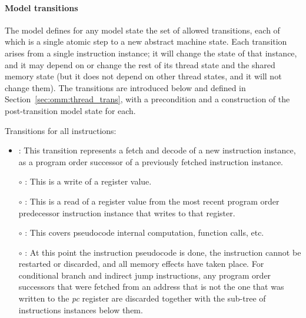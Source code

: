 \paragraph{Model transitions}
The model defines for any model state the set of allowed transitions, each of which is a single atomic step to a new abstract machine state.
Each transition arises from a single instruction instance; it will change the state of that instance, and it may depend on or change the rest of its thread state and the shared memory state (but it does not depend on other thread states, and it will not change them).
The transitions are introduced below and defined in Section~\ref{sec:omm:thread_trans}, with a precondition and a construction of the post-transition model state for each.

\noindent Transitions for all instructions:
\begin{itemize}
\item {}: This transition represents a fetch and decode of a new instruction instance, as a program order successor of a previously fetched instruction instance.
\item[$\circ$] : This is a write of a register value.
\item[$\circ$] : This is a read of a register value from the most recent program order predecessor instruction instance that writes to that register.
\item[$\circ$] : This covers pseudocode internal computation, function calls, etc.
\item[$\circ$] : At this point the instruction pseudocode is done, the instruction cannot be restarted or discarded, and all memory effects have taken place.
For conditional branch and indirect jump instructions, any program order successors that were fetched from an address that is not the one that was written to the {\em pc} register are discarded together with the sub-tree of instructions instances below them.
\end{itemize}


